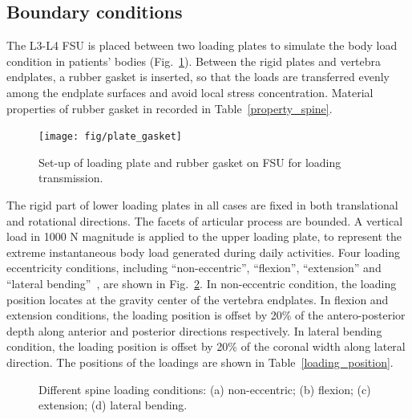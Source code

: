 \documentclass[12pt]{extbook}
\begin{document}
\subsection{Boundary conditions}

The L3-L4 FSU is placed between two loading plates to simulate the body load condition in patients' bodies (Fig.~\ref{plate_gasket}). Between the rigid plates and vertebra endplates, a rubber gasket is inserted, so that the loads are transferred evenly among the endplate surfaces and avoid local stress concentration. Material properties of rubber gasket in recorded in Table~\ref{property_spine}.\\

\begin{figure}[htbp]
\centering
\texttt{[image: fig/plate\_gasket]}
\caption{Set-up of loading plate and rubber gasket on FSU for loading transmission.}
\label{plate_gasket}
\end{figure}

The rigid part of lower loading plates in all cases are fixed in both translational and rotational directions. The facets of articular process are bounded. A vertical load in 1000 N magnitude is applied to the upper loading plate, to represent the extreme instantaneous body load generated during daily activities. Four loading eccentricity conditions, including ``non-eccentric'', ``flexion'', ``extension'' and ``lateral bending''~\cite{brandolini2014experimental}, are shown in Fig.~\ref{spine_loading}. In non-eccentric condition, the loading position locates at the gravity center of the vertebra endplates. In flexion and extension conditions, the loading position is offset by 20\% of the antero-posterior depth along anterior and posterior directions respectively. In lateral bending condition, the loading position is offset by 20\% of the coronal width along lateral direction. The positions of the loadings are shown in Table~\ref{loading_position}.\\

\begin{figure}[htbp]
\centering
{}
\caption{Different spine loading conditions: (a) non-eccentric; (b) flexion; (c) extension; (d) lateral bending.}
\label{spine_loading}
\end{figure}
\end{document}

